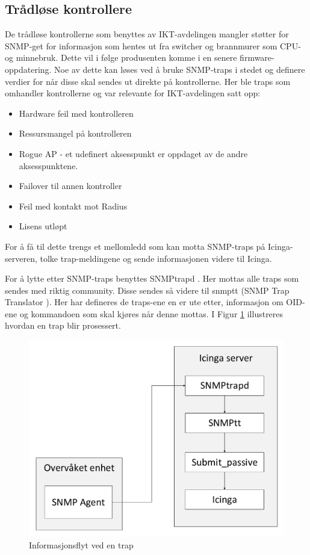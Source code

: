 \subsection{Trådløse kontrollere}

De trådløse kontrollerne som benyttes av IKT-avdelingen mangler støtter for SNMP-get for informasjon som hentes ut fra switcher og brannmurer som  CPU- og minnebruk. Dette vil i følge produsenten komme i en senere firmware-oppdatering.
Noe av dette kan løses ved å bruke SNMP-traps i stedet og definere verdier for når disse skal sendes ut direkte på kontrollerne. Her ble traps som omhandler kontrollerne og var relevante for IKT-avdelingen satt opp:

\begin{itemize}
	\item Hardware feil med kontrolleren
	\item Ressursmangel på kontrolleren
	\item Rogue AP - et udefinert aksesspunkt er oppdaget av de andre aksesspunktene.
	\item Failover til annen kontroller
	\item Feil med kontakt mot Radius
	\item Lisens utløpt
\end{itemize}

For å få til dette trengs et mellomledd som kan motta SNMP-traps på Icinga-serveren, tolke trap-meldingene og sende informasjonen videre til Icinga. 

For å lytte etter SNMP-traps benyttes SNMPtrapd \cite{snmptraps2}. Her mottas alle traps som sendes med riktig community. Disse sendes så videre til snmptt (SNMP Trap Translator \cite{traptranselator}). Her har defineres de traps-ene en er ute etter, informasjon om OID-ene og kommandoen som skal kjøres når denne mottas. I Figur \ref{snmptrap} illustreres hvordan en trap blir prosessert. 

\begin{figure}[H]
    \centering
    \includegraphics[scale=0.4]{img/SNMPtrap}
    \caption{Informasjonsflyt ved en trap}
    \label{snmptrap}
\end{figure}

